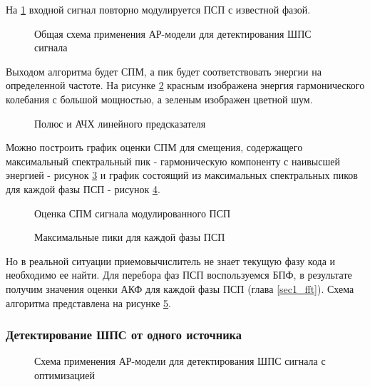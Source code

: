 На \ref{pic:lpc_basic1} входной сигнал повторно модулируется ПСП с известной фазой.

\begin{figure}[H]
	\center{}
	\caption{Общая схема применения АР-модели для детектирования ШПС сигнала}
	\label{pic:lpc_basic1}
\end{figure}

Выходом алгоритма будет СПМ, а пик будет соответствовать энергии на определенной частоте. На рисунке
\ref{pic:lpc_poles_gps} красным изображена энергия гармонического колебания с большой мощностью, а
зеленым изображен цветной шум.
\begin{figure}[H]
	\center{}
	\caption{Полюс и АЧХ линейного предсказателя}
	\label{pic:lpc_poles_gps}
\end{figure}

Можно построить график оценки СПМ для смещения,
содержащего максимальный спектральный пик - гармоническую компоненту
с наивысшей энергией - рисунок \ref{pic:lpc_psd_1} и график состоящий из максимальных спектральных пиков для каждой фазы
ПСП - рисунок \ref{pic:lpc_1sat_energy}.

\begin{figure}[H]
	\center{}
	\caption{Оценка СПМ сигнала модулированного ПСП}
	\label{pic:lpc_psd_1}
\end{figure}
\begin{figure}[H]
	\center{}
	\caption{Максимальные пики для каждой фазы ПСП}
	\label{pic:lpc_1sat_energy}
\end{figure}

Но в реальной ситуации приемовычислитель не знает текущую фазу кода и необходимо ее найти.
Для перебора фаз ПСП воспользуемся БПФ, в результате получим значения оценки АКФ для каждой фазы ПСП (глава \ref{sec1_fft}).
Схема алгоритма представлена на рисунке \ref{pic:lpc_basic2}. 

\subsubsection{Детектирование ШПС от одного источника}
\begin{figure}[H]
	\center{}
	\caption{Схема применения АР-модели для детектирования ШПС сигнала с оптимизацией}
	\label{pic:lpc_basic2}
\end{figure}



